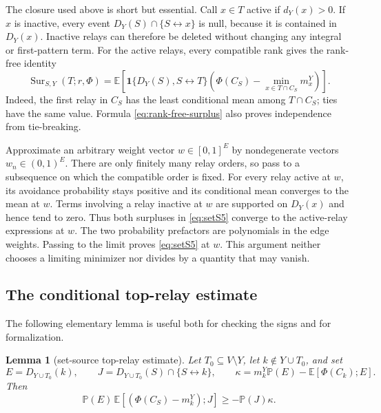 \documentclass[11pt]{article}
\newtheorem{lemma}[theorem]{Lemma}
\theoremstyle{definition}
\theoremstyle{remark}
\newcommand{\PP}{\mathbb P}
\newcommand{\EE}{\mathbb E}
\newcommand{\one}{\mathbf 1}
\newcommand{\Sur}{\operatorname{Sur}}
\newcommand{\con}{\leftrightarrow}
\begin{document}
The closure used above is short but essential.  Call $x\in T$ active if
$d_Y(x)>0$.  If $x$ is inactive, every event
$D_Y(S)\cap\{S\con x\}$ is null, because it is contained in
$D_Y(x)$.  Inactive relays can therefore be deleted without changing any
integral or first-pattern term.  For the active relays, every compatible
rank gives the rank-free identity
\begin{equation}\label{eq:rank-free-surplus}
 \Sur_{S,Y}(T;r,\Phi)=
 \EE\!\left[
  \one\{D_Y(S),S\con T\}
  \left(\Phi(C_S)-
   \min_{x\in T\cap C_S}m_x^Y\right)\right].
\end{equation}
Indeed, the first relay in $C_S$ has the least conditional mean among
$T\cap C_S$; ties have the same value.  Formula
\eqref{eq:rank-free-surplus} also proves independence from tie-breaking.

Approximate an arbitrary weight vector $w\in[0,1]^E$ by nondegenerate
vectors $w_n\in(0,1)^E$.  There are only finitely many relay orders, so
pass to a subsequence on which the compatible order is fixed.  For every
relay active at $w$, its avoidance probability stays positive and its
conditional mean converges to the mean at $w$.  Terms involving a relay
inactive at $w$ are supported on $D_Y(x)$ and hence tend to zero.  Thus
both surpluses in \eqref{eq:setS5} converge to the active-relay
expressions at $w$.  The two probability prefactors are polynomials in
the edge weights.  Passing to the limit proves \eqref{eq:setS5} at $w$.
This argument neither chooses a limiting minimizer nor divides by a
quantity that may vanish.

\subsection{The conditional top-relay estimate}

The following elementary lemma is useful both for checking the signs and
for formalization.

\begin{lemma}[set-source top-relay estimate]\label{lem:toprelay}
Let $T_0\subseteq V\setminus Y$, let $k\notin Y\cup T_0$, and set
\[
 E=D_{Y\cup T_0}(k),\qquad
 J=D_{Y\cup T_0}(S)\cap\{S\con k\},\qquad
 \kappa=m_k^Y\PP(E)-\EE[\Phi(C_k);E].
\]
Then
\begin{equation}\label{eq:toprelay}
 \PP(E)\,
 \EE[(\Phi(C_S)-m_k^Y);J]
 \geq-\PP(J)\kappa.
\end{equation}
\end{lemma}
\end{document}
